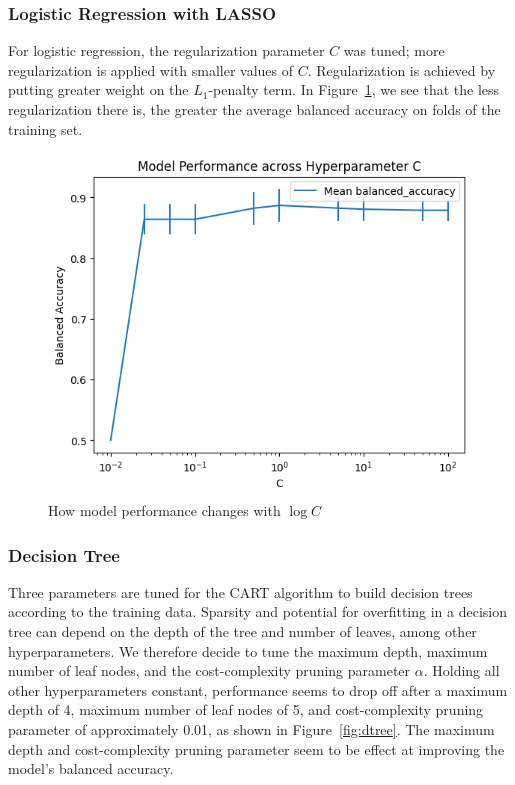 \documentclass[12pt]{article}
\newtheorem{Proof of Lemma}{Proof of Lemma}
\begin{document}
\subsubsection{Logistic Regression with LASSO}

For logistic regression, the regularization parameter $C$ was tuned; more regularization is applied with smaller values of $C$. 
Regularization is achieved by putting greater weight on the $L_1$-penalty term. In Figure~\ref{fig:logistic-reg}, we see that the 
less regularization there is, the greater the average balanced accuracy on folds of the training set.

\begin{figure}[h!]
  \centering
  \includegraphics[scale = 0.5]{logisticLASSO-C-param.png}
  \caption{How model performance changes with $\log C$}
  \label{fig:logistic-reg}
\end{figure}

\subsubsection{Decision Tree}

Three parameters are tuned for the CART algorithm to build decision trees according to the training data.
Sparsity and potential for overfitting in a decision tree can depend on the depth of the tree and number of leaves, among other 
hyperparameters. We therefore decide to tune the maximum depth, maximum number of leaf nodes, and the cost-complexity pruning parameter $\alpha$.
Holding all other hyperparameters constant, performance seems to drop off after a maximum depth of 4, maximum number of leaf nodes of 5, 
and cost-complexity pruning parameter of approximately 0.01, as shown in Figure~\ref{fig:dtree}. The maximum depth and cost-complexity pruning 
parameter seem to be effect at improving the model's balanced accuracy. 
\end{document}
